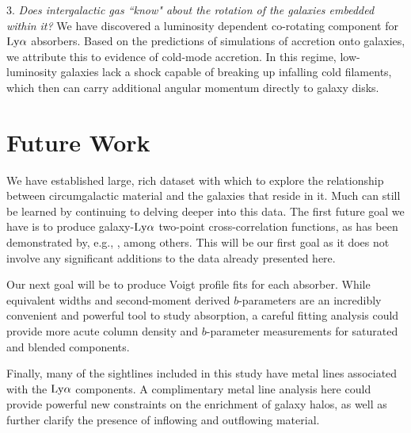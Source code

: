 \vspace{10pt}

3. \emph{Does intergalactic gas ``know" about the rotation of the galaxies embedded within it?}
We have discovered a luminosity dependent co-rotating component for $\rm Ly\alpha$ absorbers. Based on the predictions of simulations of accretion onto galaxies, we attribute this to evidence of cold-mode accretion. In this regime, low-luminosity galaxies lack a shock capable of breaking up infalling cold filaments, which then can carry additional angular momentum directly to galaxy disks.


\section{Future Work}

We have established large, rich dataset with which to explore the relationship between circumgalactic material and the galaxies that reside in it. Much can still be learned by continuing to delving deeper into this data. The first future goal we have is to produce galaxy-$\rm Ly\alpha$ two-point cross-correlation functions, as has been demonstrated by, e.g., \cite{chen2005}, among others. This will be our first goal as it does not involve any significant additions to the data already presented here.

Our next goal will be to produce Voigt profile fits for each absorber. While equivalent widths and second-moment derived $b$-parameters are an incredibly convenient and powerful tool to study absorption, a careful fitting analysis could provide more acute column density and $b$-parameter measurements for saturated and blended components.

Finally, many of the sightlines included in this study have metal lines associated with the $\rm Ly\alpha$ components. A complimentary metal line analysis here could provide powerful new constraints on the enrichment of galaxy halos, as well as further clarify the presence of inflowing and outflowing material. 

\clearpage
{} %





